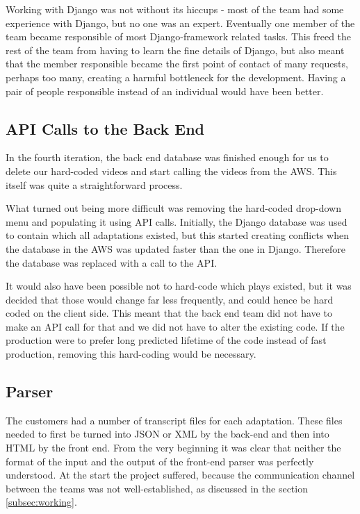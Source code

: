 \documentclass{l3proj}
\begin{document}
Working with Django was not without its hiccups - most of the team had some experience with Django, but no one was an expert. Eventually one member of the team became responsible of most Django-framework related tasks. This freed the rest of the team from having to learn the fine details of Django, but also meant that the member responsible became the first point of contact of many requests, perhaps too many, creating a harmful bottleneck for the development. Having a pair of people responsible instead of an individual would have been better.


\subsection{API Calls to the Back End}
In the fourth iteration, the back end database was finished enough for us to delete our hard-coded videos and start calling the videos from the AWS. This itself was quite a straightforward process.

What turned out being more difficult was removing the hard-coded drop-down menu and populating it using API calls. Initially, the Django database was used to contain which all adaptations existed, but this started creating conflicts when the database in the AWS was updated faster than the one in Django. Therefore the database was replaced with a call to the API.

It would also have been possible not to hard-code which plays existed, but it was decided that those would change far less frequently, and could hence be hard coded on the client side.  This meant that the back end team did not have to make an API call for that and we did not have to alter the existing code. If the production were to prefer long predicted lifetime of the code instead of fast production, removing this hard-coding would be necessary.


\subsection{Parser}
The customers had a number of transcript files for each adaptation. These files needed to first be turned into JSON or XML by the back-end and then into HTML by the front end. From the very beginning it was clear that neither the format of the input and  the output of the front-end parser was perfectly understood. At the start the project suffered, because the communication channel between the teams was not well-established, as discussed in the section \ref{subsec:working}.
\end{document}
